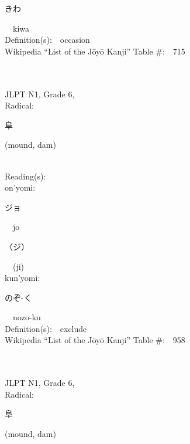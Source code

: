 \begin{multicols}{2}
{\hspace*{2em}}{\begin{CJK}{UTF8}{min} きわ \end{CJK}}\ \ kiwa\ \ \\
Definition(s):\ \ occasion \\
Wikipedia ``List of the J\=oy\=o Kanji'' Table \#:\ \ 715 \\
\ \ \\
{\fontsize{34pt}{40pt}  }\ \ \\  %
{JLPT N1, Grade 6, \\Radical:\ \ {\begin{CJK}{UTF8}{min} 阜 \end{CJK}} (mound, dam) } \\
Reading(s):\ \ \\
{\hspace*{1em}}on'yomi:\ \ \\
{\hspace*{2em}}{\begin{CJK}{UTF8}{min} ジョ \end{CJK}}\ \ jo\ \ \\
{\hspace*{2em}}{\begin{CJK}{UTF8}{min} （ジ） \end{CJK}}\ \ (ji)\ \ \\
{\hspace*{1em}}kun'yomi:\ \ \\
{\hspace*{2em}}{\begin{CJK}{UTF8}{min} のぞ-く \end{CJK}}\ \ nozo-ku\ \ \\
Definition(s):\ \ exclude \\
Wikipedia ``List of the J\=oy\=o Kanji'' Table \#:\ \ 958 \\
\ \ \\
{\fontsize{34pt}{40pt}  }\ \ \\  %
{JLPT N1, Grade 6, \\Radical:\ \ {\begin{CJK}{UTF8}{min} 阜 \end{CJK}} (mound, dam) } \\

\end{multicols}
